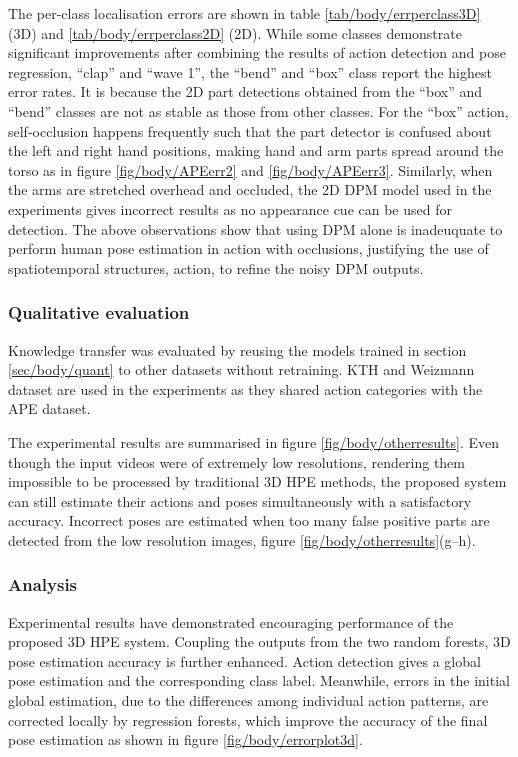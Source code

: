 



The per-class localisation errors are shown in table \ref{tab/body/errperclass3D} (3D) and \ref{tab/body/errperclass2D} (2D). While some classes demonstrate significant improvements after combining the results of action detection and pose regression, \eg ``clap'' and ``wave 1'', the ``bend'' and ``box'' class report the highest error rates. It is because the 2D part detections obtained from the ``box'' and ``bend'' classes are not as stable as those from other classes. For the ``box'' action, self-occlusion happens frequently such that the part detector is confused about the left and right hand positions, making hand and arm parts spread around the torso as in figure \ref{fig/body/APEerr2} and \ref{fig/body/APEerr3}. 
Similarly, when the arms are stretched overhead and occluded, the 2D DPM model used in the experiments gives incorrect results as no appearance cue can be used for detection. The above observations show that using DPM alone is inadeuquate to perform human pose estimation in action with occlusions, justifying the use of spatiotemporal structures, \ie action, to refine the noisy DPM outputs.  



\subsubsection{Qualitative evaluation}

Knowledge transfer was evaluated by reusing the models trained in section \ref{sec/body/quant} to other datasets without retraining.
KTH \cite{Schuldt2004} and Weizmann \cite{Gorelick2007} dataset are used in the experiments as they shared action categories with the APE dataset. 

The experimental results are summarised in figure \ref{fig/body/otherresults}. Even though the input videos were of extremely low resolutions, rendering them impossible to be processed by traditional 3D HPE methods, the proposed system can still estimate their actions and poses simultaneously with a satisfactory accuracy. 
Incorrect poses are estimated when too many false positive parts are detected from the low resolution images, \eg figure \ref{fig/body/otherresults}(g--h). 

\subsubsection{Analysis}
Experimental results have demonstrated encouraging performance of the proposed 3D HPE system.  
Coupling the outputs from the two random forests, 3D pose estimation accuracy is further enhanced. Action detection gives a global pose estimation and the corresponding class label. Meanwhile, errors in the initial global estimation, due to the differences among individual action patterns, are corrected locally by regression forests, which improve the accuracy of the final pose estimation as shown in figure \ref{fig/body/errorplot3d}. 

